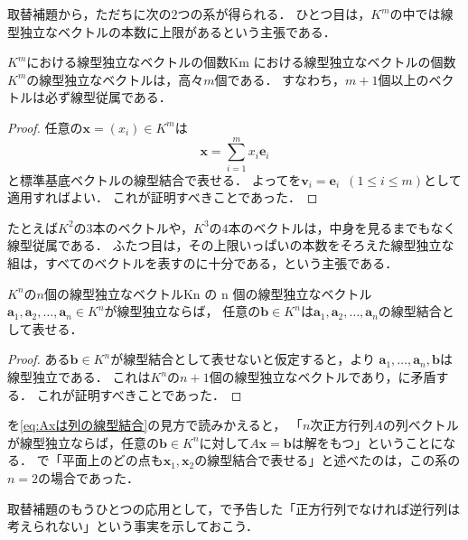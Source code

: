 取替補題から，ただちに次の$2$つの系が得られる．
ひとつ目は，$K^m$の中では線型独立なベクトルの本数に上限があるという主張である．

\begin{cor}{$K^m$における線型独立なベクトルの個数}{Km における線型独立なベクトルの個数}
  $K^m$の線型独立なベクトルは，高々$m$個である．
  すなわち，$m + 1$個以上のベクトルは必ず線型従属である．
\end{cor}

\begin{tleftbar}
\begin{proof}
  任意の$\bm{x} = (x_i) \in K^m$は
  \[
    \bm{x} = \sum_{i=1}^{m} x_i \bm{e}_i
  \]
  と標準基底ベクトルの線型結合で表せる．
  よってを$\bm{v}_i = \bm{e}_i$~$(1 \le i \le m)$として適用すればよい．
  これが証明すべきことであった．
\end{proof}
\end{tleftbar}

たとえば$K^2$の$3$本のベクトルや，$K^3$の$4$本のベクトルは，中身を見るまでもなく線型従属である．
ふたつ目は，その上限いっぱいの本数をそろえた線型独立な組は，すべてのベクトルを表すのに十分である，という主張である．

\begin{cor}{$K^n$の$n$個の線型独立なベクトル}{Kn の n 個の線型独立なベクトル}
  $\bm{a}_1, \bm{a}_2, \dots, \bm{a}_n \in K^n$が線型独立ならば，
  任意の$\bm{b} \in K^n$は$\bm{a}_1, \bm{a}_2, \dots, \bm{a}_n$の線型結合として表せる．
\end{cor}

\begin{tleftbar}
\begin{proof}
  ある$\bm{b} \in K^n$が線型結合として表せないと仮定すると，より
  $\bm{a}_1, \dots, \bm{a}_n, \bm{b}$は線型独立である．
  これは$K^n$の$n + 1$個の線型独立なベクトルであり，に矛盾する．
  これが証明すべきことであった．
\end{proof}
\end{tleftbar}

を\eqref{eq:Axは列の線型結合}の見方で読みかえると，
「$n$次正方行列$A$の列ベクトルが線型独立ならば，任意の$\bm{b} \in K^n$に対して$A\bm{x} = \bm{b}$は解をもつ」ということになる．
で「平面上のどの点も$\bm{x}_1,\bm{x}_2$の線型結合で表せる」と述べたのは，この系の$n = 2$の場合であった．

取替補題のもうひとつの応用として，で予告した「正方行列でなければ逆行列は考えられない」という事実を示しておこう．

